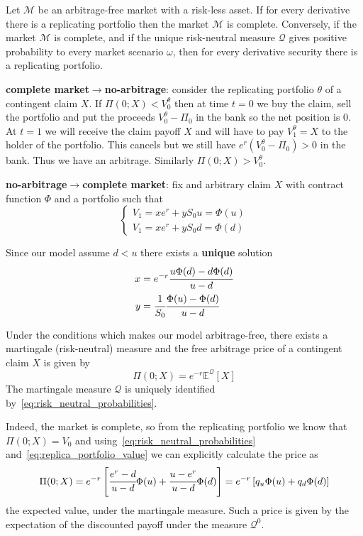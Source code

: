 \documentclass[12pt,a4paper]{book}
\begin{document}
Let $\mathcal{M}$ be an arbitrage-free market with a risk-less asset. If for every derivative there is a replicating portfolio
then the market $\mathcal{M}$ is complete. Conversely, if the market $\mathcal{M}$ is complete, and if the unique risk-neutral measure $\mathcal{Q}$ gives positive probability to every market scenario $\omega$, then for every derivative security there is a replicating portfolio.%

\textbf{complete market$\rightarrow$no-arbitrage}: consider the replicating portfolio $\theta$ of a contingent claim $X$. If $\Pi(0; X) < V_0^\theta$ then at time $t=0$ we buy the claim, sell the portfolio and put the proceeds $V_0^\theta-\Pi_0$ in the bank so the net position is 0. At $t=1$ we will receive the claim payoff $X$ and will have to pay $V_1^\theta =X$  to the holder of the portfolio. This cancels but we still have $e^r(V_0^\theta-\Pi_0)>0$ in the bank. Thus we have an arbitrage. Similarly $\Pi(0; X) > V_0^\theta$.
	
\textbf{no-arbitrage$\rightarrow$complete market}: fix and arbitrary claim $X$ with contract function $\Phi$ and a portfolio such that
\begin{equation*}
\begin{cases}
V_1 = x e^r + yS_0u = \Phi(u)\\
V_1 = x e^r + yS_0d = \Phi(d)
\end{cases}
\end{equation*}
			
Since our model assume $d<u$ there exists a \textbf{unique} solution
\begin{equation}
\begin{aligned}
x &= e^{-r}\cfrac{u\Phi(d)-d\Phi(d)}{u-d} \\
y &= \cfrac{1}{S_0}\cfrac{\Phi(u)-\Phi(d)}{u-d}
\end{aligned}
\label{eq:replica_portfolio_value}
\end{equation}

Under the conditions which makes our model arbitrage-free, there exists a martingale (risk-neutral) measure and the free arbitrage price of a contingent claim $X$ is given by 
\begin{equation*}
\Pi(0; X) = e^{-r}\mathbb{E}^{\mathcal{Q}}[X]
\end{equation*} 
The martingale measure $\mathcal{Q}$ is uniquely identified by~\ref{eq:risk_neutral_probabilities}.
		
Indeed, the market is complete, so from the replicating portfolio we know that $\Pi(0;X) = V_0$ and using~\ref{eq:risk_neutral_probabilities} and~\ref{eq:replica_portfolio_value} we can explicitly calculate the price as
\begin{equation*}
\Pi(0;X) = e^{-r}\left[\cfrac{e^r-d}{u-d}\Phi(u)+\cfrac{u-e^r}{u-d}\Phi(d)\right] = e^{-r}\left[q_u\Phi(u)+q_d\Phi(d)\right]
\end{equation*}
the expected value, under the martingale measure.
Such a price is given by the expectation of the discounted payoff under the measure $\mathcal{Q}^0$.
		
\end{document}
